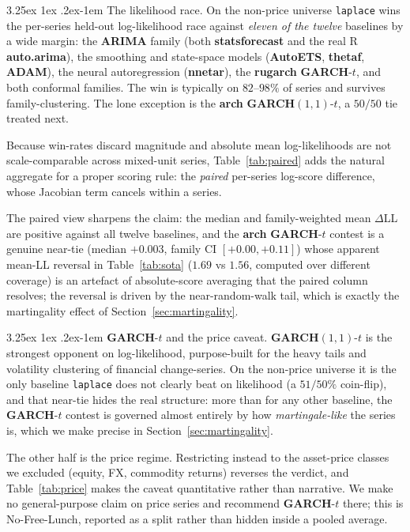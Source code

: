\documentclass[article]{jss}
\makeatletter
\renewcommand\paragraph{\@startsection{paragraph}{4}{\z@}%
  {3.25ex \@plus1ex \@minus.2ex}{-1em}%
  {\normalfont\normalsize\itshape}}
\providecommand{\proglang}[1]{\textsf{#1}}
\providecommand{\pkg}[1]{\textbf{#1}}
\providecommand{\code}[1]{\texttt{#1}}
\makeatother
\begin{document}
\paragraph{The likelihood race.}
On the non-price universe \code{laplace} wins the per-series held-out
log-likelihood race against \emph{eleven of the twelve} baselines by a wide
margin: the \pkg{ARIMA} family (both \pkg{statsforecast} and the real
\proglang{R} \pkg{auto.arima}), the smoothing and state-space models
(\pkg{AutoETS}, \pkg{thetaf}, \pkg{ADAM}), the neural autoregression
(\pkg{nnetar}), the \pkg{rugarch} \pkg{GARCH}-$t$, and both conformal families.
The win is typically on $82$--$98\%$ of series and survives family-clustering. The
lone exception is the \pkg{arch} \pkg{GARCH}$(1,1)$-$t$, a $50/50$ tie treated
next.

Because win-rates discard magnitude and absolute mean log-likelihoods are
not scale-comparable across mixed-unit series, Table~\ref{tab:paired} adds the
natural aggregate for a proper scoring rule: the \emph{paired} per-series
log-score difference, whose Jacobian term cancels within a series.

The paired
view sharpens the claim: the median and family-weighted mean $\Delta$LL are
positive against all twelve baselines, and the \pkg{arch} \pkg{GARCH}-$t$
contest is a genuine near-tie (median $+0.003$, family CI $[+0.00, +0.11]$)
whose apparent mean-LL reversal in Table~\ref{tab:sota} ($1.69$ vs $1.56$,
computed over different coverage) is an artefact of absolute-score averaging
that the paired column resolves; the reversal is driven by the near-random-walk
tail, which is exactly the martingality effect of Section~\ref{sec:martingality}.

\paragraph{\pkg{GARCH}-$t$ and the price caveat.}
\pkg{GARCH}$(1,1)$-$t$ is the strongest opponent on log-likelihood, purpose-built
for the heavy tails and volatility clustering of financial change-series. On the
non-price universe it is the only baseline \code{laplace} does not clearly beat on
likelihood (a $51/50\%$ coin-flip), and that near-tie hides the real
structure: more than for any other baseline, the \pkg{GARCH}-$t$ contest is governed
almost entirely by how
\emph{martingale-like} the series is, which we make precise in
Section~\ref{sec:martingality}.

The other half is the price regime.
Restricting instead to the asset-price classes we
excluded (equity, FX, commodity returns) reverses the verdict, and
Table~\ref{tab:price} makes the caveat quantitative rather than narrative. We
make no general-purpose claim on price series and recommend \pkg{GARCH}-$t$
there; this is No-Free-Lunch, reported as a split rather than hidden inside a
pooled average.
\end{document}
